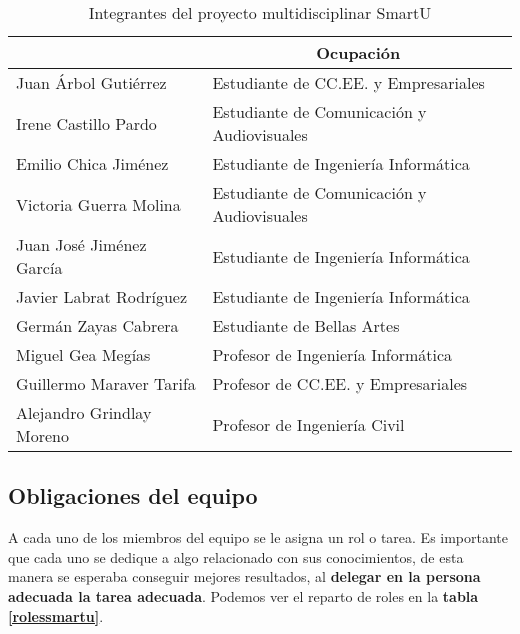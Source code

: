 \begin{table}
    \begin{center}
        \begin{tabular}{|p{4.5cm}|p{6.5cm}|}
            \hline
                \rowcolor{Gray}\multicolumn{1}{|c|}{\textbf{Integrante}}
                & \multicolumn{1}{|c|}{\textbf{Ocupación}} \\
            \hline
                Juan Árbol Gutiérrez & Estudiante de CC.EE. y Empresariales \\
            \hline
                Irene Castillo Pardo & Estudiante de Comunicación y Audiovisuales \\
            \hline
                Emilio Chica Jiménez & Estudiante de Ingeniería Informática \\
            \hline
                Victoria Guerra Molina & Estudiante de Comunicación y Audiovisuales \\
            \hline
                Juan José Jiménez García & Estudiante de Ingeniería Informática \\
            \hline
                Javier Labrat Rodríguez & Estudiante de Ingeniería Informática \\
            \hline
                Germán Zayas Cabrera & Estudiante de Bellas Artes \\
            \hline
                Miguel Gea Megías & Profesor de Ingeniería Informática \\
            \hline
                Guillermo Maraver Tarifa & Profesor de CC.EE. y Empresariales \\
            \hline
                Alejandro Grindlay Moreno & Profesor de Ingeniería Civil \\
            \hline
        \end{tabular}
        \caption{Integrantes del proyecto multidisciplinar SmartU}
        \label{miembrossmartu}
    \end{center}
\end{table}

\subsection{Obligaciones del equipo}
A cada uno de los miembros del equipo se le asigna un rol o tarea. Es importante que cada uno se dedique a algo relacionado con sus conocimientos, de esta manera se esperaba conseguir mejores resultados, al \textbf{delegar en la persona adecuada la tarea adecuada}. Podemos ver el reparto de roles en la \textbf{tabla \ref{rolessmartu}}.\\

